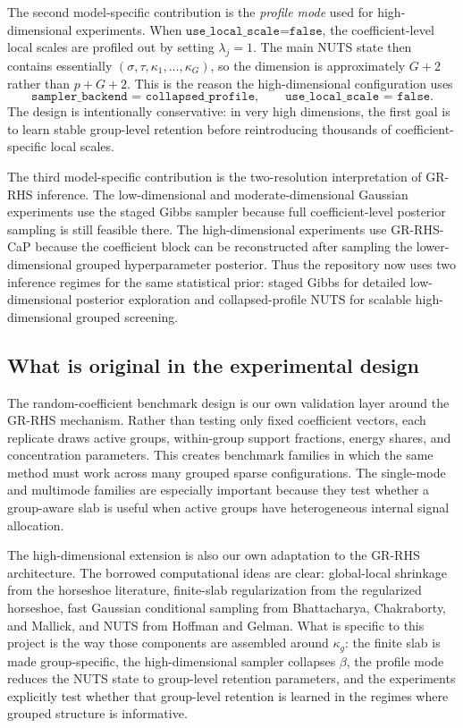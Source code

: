 \documentclass[11pt]{article}
\begin{document}
The second model-specific contribution is the \emph{profile mode} used for
high-dimensional experiments. When \(\texttt{use\_local\_scale=false}\), the
coefficient-level local scales are profiled out by setting \(\lambda_j=1\). The
main NUTS state then contains essentially \((\sigma,\tau,\kappa_1,\dots,
\kappa_G)\), so the dimension is approximately \(G+2\) rather than \(p+G+2\).
This is the reason the high-dimensional configuration uses
\[
  \texttt{sampler\_backend = collapsed\_profile},
  \qquad
  \texttt{use\_local\_scale = false}.
\]
The design is intentionally conservative: in very high dimensions, the first
goal is to learn stable group-level retention before reintroducing thousands of
coefficient-specific local scales.

The third model-specific contribution is the two-resolution interpretation of
GR-RHS inference. The low-dimensional and moderate-dimensional Gaussian
experiments use the staged Gibbs sampler because full coefficient-level
posterior sampling is still feasible there. The high-dimensional experiments
use GR-RHS-CaP because the coefficient block can be reconstructed after
sampling the lower-dimensional grouped hyperparameter posterior. Thus the
repository now uses two inference regimes for the same statistical prior:
staged Gibbs for detailed low-dimensional posterior exploration and
collapsed-profile NUTS for scalable high-dimensional grouped screening.

\subsection{What is original in the experimental design}

The random-coefficient benchmark design is our own validation layer around the
GR-RHS mechanism. Rather than testing only fixed coefficient vectors, each
replicate draws active groups, within-group support fractions, energy shares,
and concentration parameters. This creates benchmark families in which the
same method must work across many grouped sparse configurations. The
single-mode and multimode families are especially important because they test
whether a group-aware slab is useful when active groups have heterogeneous
internal signal allocation.

The high-dimensional extension is also our own adaptation to the GR-RHS
architecture. The borrowed computational ideas are clear: global-local
shrinkage from the horseshoe literature, finite-slab regularization from the
regularized horseshoe, fast Gaussian conditional sampling from Bhattacharya,
Chakraborty, and Mallick, and NUTS from Hoffman and Gelman. What is specific
to this project is the way those components are assembled around
\(\kappa_g\): the finite slab is made group-specific, the high-dimensional
sampler collapses \(\beta\), the profile mode reduces the NUTS state to
group-level retention parameters, and the experiments explicitly test whether
that group-level retention is learned in the regimes where grouped structure is
informative.
\end{document}
